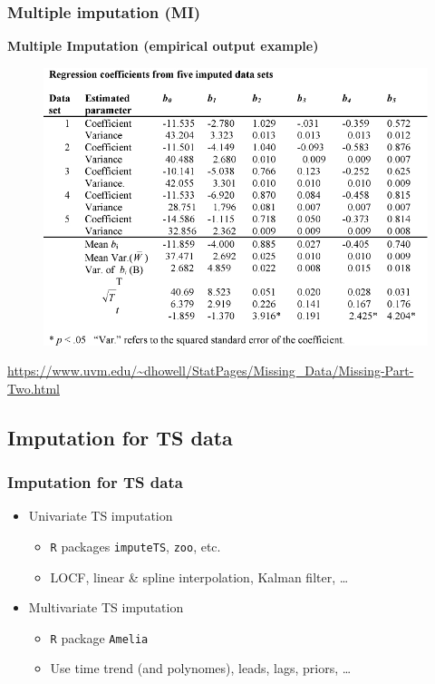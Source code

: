 \documentclass{beamer}
\begin{document}
\begin{frame}
\frametitle{Multiple imputation (MI)}
\textbf{Multiple Imputation (empirical output example) }
\begin{figure}
\includegraphics[width=0.7\linewidth]{IMG/mitable.jpg}
\end{figure}
\scriptsize{\url{https://www.uvm.edu/~dhowell/StatPages/Missing_Data/Missing-Part-Two.html}}
\end{frame}
\subsection{Imputation for TS data}
\begin{frame}
\frametitle{Imputation for TS data}
\begin{itemize}
    \item Univariate TS imputation
    \medskip
        \begin{itemize}
        \item \texttt{R} packages \texttt{imputeTS}, \texttt{zoo}, etc.
        \medskip
        \item LOCF, linear \& spline interpolation, Kalman filter, \dots
    \end{itemize}
    \bigskip
    \item Multivariate TS imputation
    \medskip
    \begin{itemize}
        \item \texttt{R} package \texttt{Amelia}
        \medskip
        \item Use time trend (and polynomes), leads, lags, priors, \dots
    \end{itemize}
\end{itemize}

 \end{frame}
\end{document}
